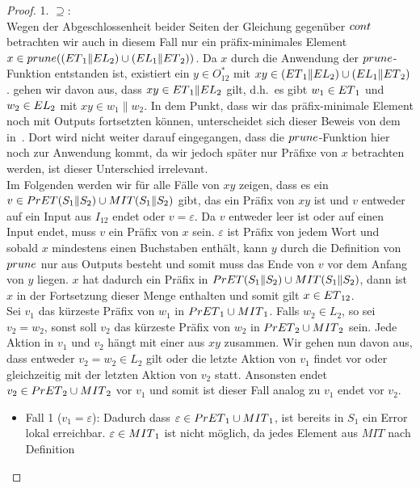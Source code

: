 \begin{proof}
  1. \glqq $\supseteq$\grqq :\\
  Wegen der Abgeschlossenheit beider Seiten der Gleichung gegenüber $cont{}$
  betrachten wir auch in diesem Fall nur ein präfix-minimales Element $x\in
  prune{}((ET{}_1\|EL{}_2)\cup (EL{}_1\|ET{}_2))$. Da $x$ durch die Anwendung der
  $prune{}$-Funktion entstanden ist, existiert ein $y\in O_{12}^*$ mit
  $xy\in(ET{}_1\|EL{}_2)\cup (EL{}_1\|ET{}_2)$. \OBdA{} gehen wir davon aus, dass
  $xy\in ET{}_1\|EL{}_2$ gilt, d.h.\ es gibt $w_1\in ET{}_1$ und $w_2\in EL{}_2$ mit
  $xy\in w_1\|w_2$. In dem Punkt, dass wir das präfix-minimale Element noch mit
  Outputs fortsetzten können, unterscheidet sich dieser Beweis von dem
  in~\cite{Schlosser2012BA}. Dort wird nicht weiter darauf eingegangen, dass
  die $prune{}$-Funktion hier noch zur Anwendung kommt, da wir jedoch später nur
  Präfixe von $x$ betrachten werden, ist dieser Unterschied irrelevant.\\
  Im Folgenden werden wir für alle Fälle von $xy$ zeigen, dass es ein $v\in
  PrET{}(S_1\|S_2)\cup MIT{}(S_1\|S_2)$ gibt, das ein Präfix von $xy$ ist und $v$
  entweder auf ein Input aus $I_{12}$ endet oder $v = \varepsilon$. Da $v$
  entweder leer ist oder auf einen Input endet, muss $v$ ein Präfix von $x$
  sein. $\varepsilon$ ist Präfix von jedem Wort und sobald $x$ mindestens einen
  Buchstaben enthält, kann $y$ durch die Definition von $prune{}$ nur aus Outputs
  besteht und somit muss das Ende von $v$ vor dem Anfang von $y$ liegen. $x$
  hat dadurch ein Präfix in $PrET{}(S_1\|S_2)\cup MIT{}(S_1\|S_2)$, dann ist $x$ in
  der Fortsetzung dieser Menge enthalten und somit gilt $x\in ET{}_{12}$.\\
  Sei $v_1$ das kürzeste Präfix von $w_1$ in $PrET{}_1\cup MIT{}_1$. Falls
  $w_2\in L_2$, so sei $v_2=w_2$, sonst soll $v_2$ das kürzeste Präfix von
  $w_2$ in $PrET{}_2\cup MIT{}_2$ sein. Jede Aktion in $v_1$ und $v_2$ hängt mit
  einer aus $xy$ zusammen. Wir gehen nun davon aus, dass entweder
  $v_2=w_2\in L_2$ gilt oder die letzte Aktion von $v_1$ findet vor oder
  gleichzeitig mit der letzten Aktion von $v_2$ statt. Ansonsten endet
  $v_2\in PrET{}_2\cup MIT{}_2$ vor $v_1$ und somit ist dieser Fall analog zu $v_1$
  endet vor $v_2$.
  \begin{itemize}
    \item Fall 1 ($v_1=\varepsilon$): Dadurch dass $\varepsilon\in PrET{}_1\cup
      MIT{}_1$, ist bereits in $S_1$ ein Error lokal erreichbar. $\varepsilon\in
      MIT{}_1$ ist nicht möglich, da jedes Element aus $MIT$ nach Definition

\end{itemize}
\end{proof}
